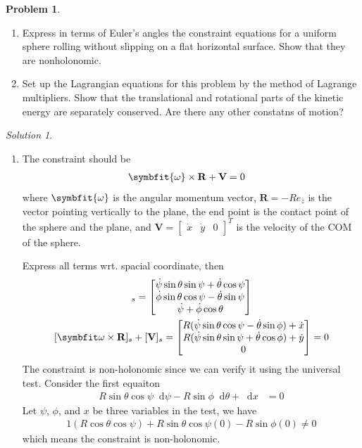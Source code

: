 \documentclass[twoside,11pt]{article}
\newcommand{\lms}{\fontfamily{lmss}\selectfont} %
\renewcommand*\d{\mathop{}\!\mathrm{d}}
\theoremstyle{definition}
\newtheorem{problem}{\lms Problem}
\theoremstyle{remark}
\newtheorem*{solution}{Solution}
\begin{document}
\begin{problem}~
\begin{enumerate}[label=\arabic*)]
\item Express in terms of Euler's angles the constraint equations for a uniform
sphere rolling without slipping on a flat horizontal surface.
Show that they are nonholonomic.

\item Set up the Lagrangian equations for this problem by the method of Lagrange
multipliers.
Show that the translational and rotational parts of the kinetic energy are separately
conserved.
Are there any other constatns of motion?
\end{enumerate}
\end{problem}
\begin{solution}~
\begin{enumerate}[label=\arabic*)]
\item The constraint should be
\begin{align*}
    \symbfit{\omega}\times\mathbf{R} + \mathbf{V} &= 0
\end{align*}
where $\symbfit{\omega}$ is the angular momentum vector,
$\mathbf R = -R e_z$ is the vector pointing vertically to the plane,
the end point is the contact point of the sphere and the plane,
and $\mathbf{V}=\begin{bmatrix} \dot x & \dot y & 0\end{bmatrix}^T$
is the velocity of the COM of the sphere.

Express all terms wrt. spacial coordinate, then
\begin{gather*}
    [\symbfit{\omega}]_s = \begin{bmatrix}
        \dot\psi\sin\theta\sin\psi + \dot\theta\cos\psi\\
        \dot\phi\sin\theta\cos\psi - \dot\theta\sin\psi\\
        \dot\psi + \dot\phi\cos\theta
    \end{bmatrix}\\
    [\symbfit\omega\times\mathbf R]_s + [\mathbf V]_s =
    \begin{bmatrix}
        R(\dot\psi\sin\theta\cos\psi - \dot\theta\sin\phi) + \dot x\\
        R(\dot\psi\sin\theta\sin\psi + \dot\theta\cos\phi) + \dot y\\
        0 
    \end{bmatrix}
    = 0
\end{gather*}
The constraint is non-holonomic since we can verify it using the universal test.
Consider the first equaiton
\begin{align*}
    R\sin\theta\cos\psi\d\psi - R\sin\phi\d\theta + \d x &= 0
\end{align*}
Let $\psi$, $\phi$, and $x$ be three variables in the test, we have
\begin{align*}
    1(R\cos\theta\cos\psi) + R\sin\theta\cos\psi (0) - R\sin\phi (0) \neq 0
\end{align*}
which means the constraint is non-holonomic.


\end{enumerate}
\end{solution}
\end{document}
